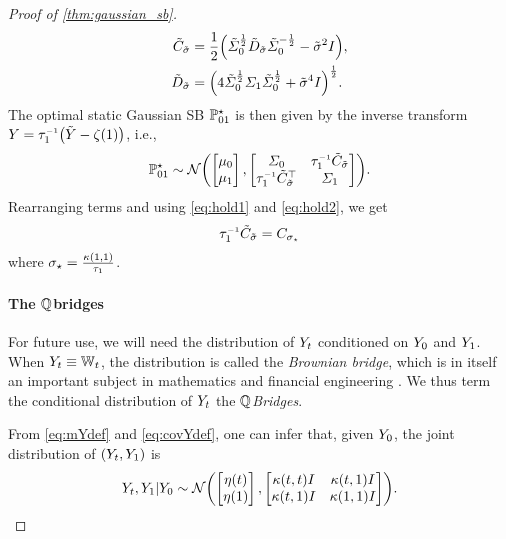 \begin{proof}[Proof of \cref{thm:gaussian_sb}]
\begin{align}
\label{eq:hold1}
\tilde{C}_{\tilde{\sdev}} &=  \frac{1}{2}\parens*{\tcovar^{\frac{1}{2}} \tilde{D}_{\tilde{\sdev}} \tcovar^{-\frac{1}{2}} - \tilde{\sdev}^2\eye}, \\
\label{eq:hold2}
\tilde{D}_{\tilde{\sdev}} &= \parens*{ 4\tcovar^{\frac{1}{2}} \covaralt \tcovar^{\frac{1}{2}} +  \tilde{\sdev}^4\eye  }^{\frac{1}{2}}.
\end{align}
The optimal static Gaussian \acrshort{SB} $\Pstasol$ is then given by the inverse transform $Y = \aggtimeinv[\horizon] \parens*{\tilde{Y} - \tshift[\horizon]}$, i.e.,
\begin{align}
\label{eq:Pstasol}
\Pstasol \sim \Ncal \parens*{  \begin{bmatrix}
\m \\
\malt
\end{bmatrix},  \begin{bmatrix}
\covar &  \aggtimeinv[\horizon] \tilde{C}_{\tilde{\sdev}    } \\
\aggtimeinv[\horizon]\tilde{C}_{ \tilde{\sdev}}^\top & \covaralt
\end{bmatrix}}.
\end{align}Rearranging terms and using \eqref{eq:hold1} and \eqref{eq:hold2}, we get 
\begin{align}
\aggtimeinv[\horizon] \tilde{C}_{\tilde{\sdev}} = C_{\sdev_\star}
\end{align}where $\sdev_\star = \frac{\kernel[\horizon][\horizon]}{ \aggtime[\horizon] }$.


\paragraph{The $\refprobase$\textendash bridges}

For future use, we will need the distribution of $\refsde$ conditioned on $\refsde[0]$ and $\refsde[\horizon]$. When $\refsde \equiv \Wiener$, the distribution is called the \emph{Brownian bridge}, which is in itself an important subject in mathematics and financial engineering \citep{mansuy2008aspects}. We thus term the conditional distribution of $\refsde$ the \emph{$\refprobase$\textendash Bridges}.

From \eqref{eq:mYdef} and \eqref{eq:covYdef}, one can infer that, given $\refsde[0]$, the joint distribution of $\parens*{\refsde,\refsde[\horizon]}$ is 
\begin{align}
\refsde,\refsde[\horizon] \vert \refsde[0] \sim  \Ncal \parens*{  \begin{bmatrix}
\mYcinit[\ctime] \\
\mYcinit[\horizon]
\end{bmatrix},  \begin{bmatrix}
\kernel[\ctime][\ctime] \eye &  \kernel[\ctime][\horizon]\eye \\
\kernel[\ctime][\horizon]\eye & \kernel[\horizon][\horizon]\eye
\end{bmatrix} }.
\end{align}


\end{proof}
